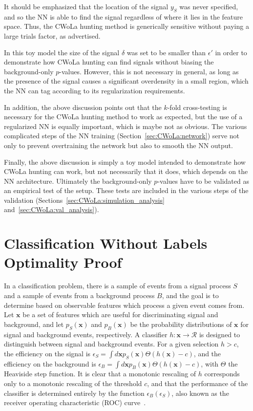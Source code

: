 It should be emphasized that the location of the signal $y_S$ was never specified, and so the NN is able to find the signal regardless of where it lies in the feature space.
Thus, the CWoLa hunting method is generically sensitive without paying a large trials factor, as advertised.

In this toy model the size of the signal $\delta$ was set to be smaller than $\epsilon'$ in order to demonstrate how CWoLa hunting can find signals without biasing the background-only $p$-values.
However, this is not necessary in general, as long as the presence of the signal causes a significant overdensity in a small region, which the NN can tag according to its regularization requirements. 

In addition, the above discussion points out that the $k$-fold cross-testing is necessary for the CWoLa hunting method to work as expected, but the use of a regularized NN is equally important, which is maybe not as obvious.
The various complicated steps of the NN training (Section~\ref{sec:CWoLa:network}) serve not only to prevent overtraining the network but also to smooth the NN output.

Finally, the above discussion is simply a toy model intended to demonstrate how CWoLa hunting can work, but not necessarily that it does, which depends on the NN architecture.
Ultimately the background-only $p$-values have to be validated as an empirical test of the setup.
These tests are included in the various steps of the validation (Sections~\ref{sec:CWoLa:simulation_analysis} and~\ref{sec:CWoLa:val_analysis}).

\section{Classification Without Labels Optimality Proof}
\label{app:CWoLa:CWoLa_proof}
In a classification problem, there is a sample of events from a signal process $S$ and a sample of events from a background process $B$, and the goal is to determine based on observable features which process a given event comes from.
Let $\mathbf{x}$ be a set of features which are useful for discriminating signal and background, and let $p_S(\mathbf{x})$ and $p_B(\mathbf{x})$ be the probability distributions of $\mathbf{x}$ for signal and background events, respectively.
A classifier $h: \mathbf{x}\rightarrow \mathcal{R}$ is designed to distinguish between signal and background events.
For a given selection $h>c$, the efficiency on the signal is $\epsilon_S = \int d\mathbf{x} p_S(\mathbf{x}) \Theta\left(h(\mathbf{x})-c\right)$, and the efficiency on the background is $\epsilon_B = \int d\mathbf{x} p_B(\mathbf{x}) \Theta\left(h(\mathbf{x})-c\right)$, with $\Theta$ the Heaviside step function.
It is clear that a monotonic rescaling of $h$ corresponds only to a monotonic rescaling of the threshold $c$, and that the performance of the classifier is determined entirely by the function $\epsilon_B(\epsilon_S)$, also known as the receiver operating characteristic (ROC) curve~\cite{egan1975signal}.

